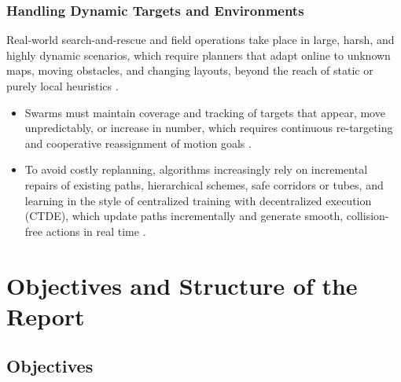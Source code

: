 \subsubsection{Handling Dynamic Targets and Environments}

Real-world search-and-rescue and field operations take place in large, harsh,
and highly dynamic scenarios, which require planners that adapt online to
unknown maps, moving obstacles, and changing layouts, beyond the reach of static
or purely local heuristics \cite{lin2022review,abujabal2024path,chen2025survey}.
\begin{itemize}
  \item {} Swarms must maintain coverage and
        tracking of targets that appear, move unpredictably, or increase in
        number, which requires continuous re-targeting and cooperative
        reassignment of motion goals \cite{li2019twostage,azzam2023swarm}.
  \item {} To avoid costly replanning, algorithms
        increasingly rely on incremental repairs of existing paths, hierarchical
        schemes, safe corridors or tubes, and learning in the style of
        centralized training with decentralized execution (CTDE), which update
        paths incrementally and generate smooth, collision-free actions in real
        time \cite{li2021rrt,mao2023optimal,azzam2023swarm}.
\end{itemize}

\section{Objectives and Structure of the Report}\label{sec:structure}

\subsection{Objectives}

